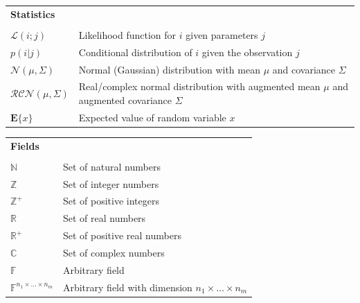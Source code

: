 \documentclass[11pt,twoside]{report}
\begin{document}
\begin{longtable}{p{} p{}}
\textbf{Statistics} & \null \\ %
\\
$\mathcal{L}(i;j)$ & Likelihood function for $i$ given parameters $j$ \\
$p(i|j)$ & Conditional distribution of $i$ given the observation $j$ \\
$\mathcal{N}(\mu,\Sigma)$ & Normal (Gaussian) distribution with mean $\mu$ and covariance $\Sigma$ \\
$\mathcal{RCN}(\mu,\Sigma)$ & Real/complex normal distribution with augmented mean $\mu$ and augmented covariance $\Sigma$ \\
$\mathbf{E} \{ x \}$ & Expected value of random variable $x$ 
\end{longtable}
\thispagestyle{plain}

\vspace{2cm}
\begin{longtable}{p{} p{}}
\textbf{Fields} & \null \\ %
\\
$\mathbb{N}$ & Set of natural numbers \\
$\mathbb{Z}$ & Set of integer numbers \\
$\mathbb{Z}^+$ & Set of positive integers \\
$\mathbb{R}$ & Set of real numbers \\
$\mathbb{R}^+$ & Set of positive real numbers \\
$\mathbb{C}$ & Set of complex numbers \\
$\mathbb{F}$ & Arbitrary field \\
$\mathbb{F}^{n_1 \times \hdots \times n_m}$ & Arbitrary field with dimension $n_1 \times \hdots \times n_m$
\end{longtable}
\thispagestyle{plain}
\end{document}
